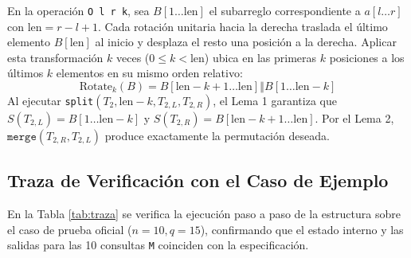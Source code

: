 \documentclass[journal,10pt,a4paper]{IEEEtran}
\begin{document}
En la operación \texttt{O l r k}, sea $B[1 \dots \text{len}]$ el subarreglo correspondiente a $a[l \dots r]$ con $\text{len} = r - l + 1$. Cada rotación unitaria hacia la derecha traslada el último elemento $B[\text{len}]$ al inicio y desplaza el resto una posición a la derecha. Aplicar esta transformación $k$ veces ($0 \le k < \text{len}$) ubica en las primeras $k$ posiciones a los últimos $k$ elementos en su mismo orden relativo:
\begin{equation}
    \text{Rotate}_k(B) = B[\text{len} - k + 1 \dots \text{len}] \mathbin{\Vert} B[1 \dots \text{len} - k]
\end{equation}
Al ejecutar \texttt{split}$(T_2, \text{len} - k, T_{2,L}, T_{2,R})$, el Lema 1 garantiza que $S(T_{2,L}) = B[1 \dots \text{len} - k]$ y $S(T_{2,R}) = B[\text{len} - k + 1 \dots \text{len}]$. Por el Lema 2, $\texttt{merge}(T_{2,R}, T_{2,L})$ produce exactamente la permutación deseada.

\subsection{Traza de Verificación con el Caso de Ejemplo}

En la Tabla \ref{tab:traza} se verifica la ejecución paso a paso de la estructura sobre el caso de prueba oficial ($n = 10, q = 15$), confirmando que el estado interno y las salidas para las 10 consultas \texttt{M} coinciden con la especificación.
\end{document}
